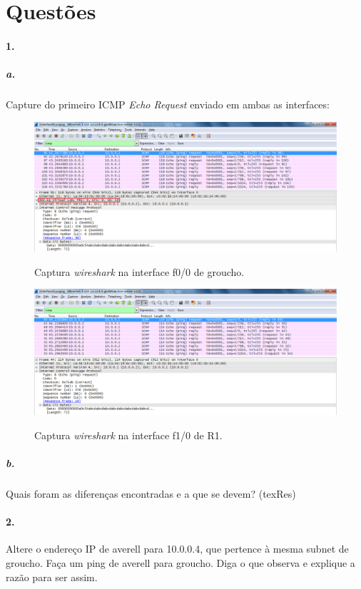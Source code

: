 \section*{Questões}
\paragraph{1.}

\subparagraph{a.}
Capture do primeiro ICMP \emph{Echo Request} enviado em ambas as interfaces:

\begin{figure}[h]
\centering
\includegraphics[width=1\textwidth, height=0.33\textheight]{1_interface00-groucho.png}
\label{fig:2-capturaWireshark}
\caption{Captura \emph{wireshark} na interface \textsf{f0/0} de \textsf{groucho}.}
\end{figure}

\begin{figure}[h]
\centering
\includegraphics[width=1\textwidth, height=0.33\textheight]{1_interface10-R1.png}
\label{fig:2-capturaWireshark}
\caption{Captura \emph{wireshark} na interface \textsf{f1/0} de \textsf{R1}.}
\end{figure}


\subparagraph{b.}
Quais foram as diferenças encontradas e a que se devem? (texRes)


\paragraph{2.}
Altere o endereço IP de averell para 10.0.0.4, que pertence à mesma subnet de groucho. Faça um ping de averell para groucho. Diga o que observa e explique a razão para ser assim.



